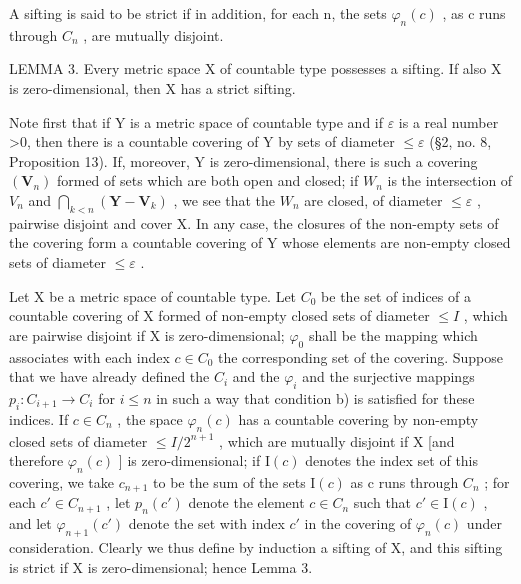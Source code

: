 A sifting is said to be strict if in addition, for each n, the sets \(\varphi_{n}(c)\) , as c runs through \(C_{n}\) , are mutually disjoint.

LEMMA 3. Every metric space X of countable type possesses a sifting. If also X is zero-dimensional, then X has a strict sifting.

Note first that if Y is a metric space of countable type and if \(\varepsilon\) is a real number \textgreater0, then there is a countable covering of Y by sets of diameter \(\leqslant\varepsilon\) (§2, no. 8, Proposition 13). If, moreover, Y is zero-dimensional, there is such a covering \((\mathbf{V}_{n})\) formed of sets which are both open and closed; if \(W_{n}\) is the intersection of \(V_{n}\) and \(\bigcap_{k<n}(\mathbf{Y}-\mathbf{V}_{k})\) , we see that the \(W_{n}\) are closed, of diameter \(\leqslant\varepsilon\) , pairwise disjoint and cover X. In any case, the closures of the non-empty sets of the covering form a countable covering of Y whose elements are non-empty closed sets of diameter \(\leqslant\varepsilon\) .

Let X be a metric space of countable type. Let \(C_{0}\) be the set of indices of a countable covering of X formed of non-empty closed sets of diameter \(\leqslant I\) , which are pairwise disjoint if X is zero-dimensional; \(\varphi_{0}\) shall be the mapping which associates with each index \(c \in C_{0}\) the corresponding set of the covering. Suppose that we have already defined the \(C_{i}\) and the \(\varphi_{i}\) and the surjective mappings \(p_{i}: C_{i+1} \to C_{i}\) for \(i \leqslant n\) in such a way that condition b) is satisfied for these indices. If \(c \in C_{n}\) , the space \(\varphi_{n}(c)\) has a countable covering by non-empty closed sets of diameter \(\leqslant I/2^{n+1}\) , which are mutually disjoint if X {[}and therefore \(\varphi_{n}(c)\) {]} is zero-dimensional; if \(\mathrm{I}(c)\) denotes the index set of this covering, we take \(c_{n+1}\) to be the sum of the sets \(\mathrm{I}(c)\) as c runs through \(C_{n}\) ; for each \(c' \in C_{n+1}\) , let \(p_{n}(c')\) denote the element \(c \in C_{n}\) such that \(c' \in \mathrm{I}(c)\) , and let \(\varphi_{n+1}(c')\) denote the set with index \(c'\) in the covering of \(\varphi_{n}(c)\) under consideration. Clearly we thus define by induction a sifting of X, and this sifting is strict if X is zero-dimensional; hence Lemma 3.

